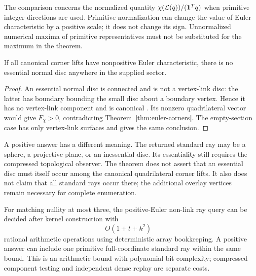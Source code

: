 The comparison concerns the normalized quantity
$\chi(\mathcal L(q))/(\mathbf1^Tq)$ when primitive integer directions are used.
Primitive normalization can change the value of Euler characteristic by
a positive scale; it does not change its sign. Unnormalized numerical
maxima of primitive representatives must not be substituted for the
maximum in the theorem.

\begin{corollary}
\label{cor:no-disc-corners}
If all canonical corner lifts have nonpositive Euler characteristic,
there is no essential normal disc anywhere in the supplied sector.
\end{corollary}

\begin{proof}
An essential normal disc is connected and is not a vertex-link disc:
the latter has boundary bounding the small disc about a boundary vertex.
Hence it has no vertex-link component and is canonical
\cite[Definitions 3.1 and 3.9, Lemma 3.5]{burtonconversion}. Its
nonzero quadrilateral vector would give $F_\chi>0$, contradicting
Theorem~\ref{thm:euler-corners}. The empty-section case has only
vertex-link surfaces and gives the same conclusion.
\end{proof}

A positive answer has a different meaning. The returned standard ray
may be a sphere, a projective plane, or an inessential disc. Its essentiality
still requires the compressed topological observer. The theorem does
not assert that an essential disc must itself occur among the canonical
quadrilateral corner lifts. It also does not claim that all standard
rays occur there; the additional overlay vertices remain necessary for
complete enumeration.

\begin{theorem}
\label{thm:euler-complexity}
For matching nullity at most three, the positive-Euler non-link ray query
can be decided after kernel construction with
\[
 O(1+t+k^2)
\]
rational arithmetic operations using deterministic array bookkeeping.
A positive answer can include one primitive full-coordinate standard ray
within the same bound. This is an arithmetic bound with polynomial bit
complexity; compressed component testing and independent dense replay
are separate costs.
\end{theorem}

